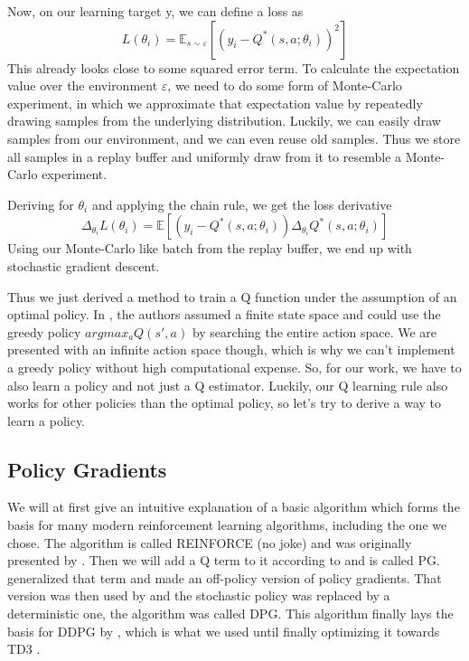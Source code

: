 \documentclass[hyperref,german,beleg]{cgvpub}
\begin{document}
Now, on our learning target y, we can define a loss as
\begin{equation}
L(\theta_i) = \mathbb{E}_{s \sim \varepsilon}[(y_i - Q^*(s, a;\theta_i))^2]
\end{equation}
This already looks close to some squared error term. To calculate the expectation value over the environment $\varepsilon$, we need to do some form of Monte-Carlo experiment, in which we approximate that expectation value by repeatedly drawing samples from the underlying distribution. Luckily, we can easily draw samples from our environment, and we can even reuse old samples. Thus we store all samples in a replay buffer and uniformly draw from it to resemble a Monte-Carlo experiment. 

Deriving for $\theta_i$ and applying the chain rule, we get the loss derivative
\begin{equation}
\Delta_{\theta_i} L(\theta_i) = \mathbb{E}[(y_i - Q^*(s, a;\theta_i))\Delta_{\theta_i}Q^*(s, a;\theta_i)]
\end{equation}
Using our Monte-Carlo like batch from the replay buffer, we end up with stochastic gradient descent.

Thus we just derived a method to train a Q function under the assumption of an optimal policy. In \cite{mnihPlayingAtariDeep2013}, the authors assumed a finite state space and could use the greedy policy $argmax_a Q(s', a)$ by searching the entire action space. We are presented with an infinite action space though, which is why we can't implement a greedy policy without high computational expense. So, for our work, we have to also learn a policy and not just a Q estimator. Luckily, our Q learning rule also works for other policies than the optimal policy, so let's try to derive a way to learn a policy.


\subsection{Policy Gradients}

We will at first give an intuitive explanation of a basic algorithm which forms the basis for many modern reinforcement learning algorithms, including the one we chose. The algorithm is called \ac{REINFORCE} (no joke) and was originally presented by \cite{williamsSimpleStatisticalGradientfollowing}. Then we will add a Q term to it according to \cite{suttonPolicyGradientMethods} and is called \ac{PG}. \cite{degrisOffPolicyActorCritic2013} generalized that term and made an off-policy version of policy gradients. That version was then used by \cite{silverDeterministicPolicyGradient2013} and the stochastic policy was replaced by a deterministic one, the algorithm was called \ac{DPG}. This algorithm finally lays the basis for \ac{DDPG} by \cite{lillicrapCONTINUOUSCONTROLDEEP2015}, which is what we used until finally optimizing it towards \ac{TD3} \cite{fujimotoAddressingFunctionApproximation2018}.
\end{document}
